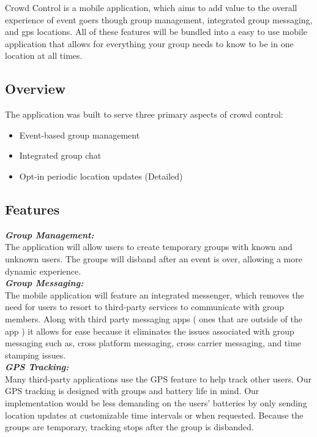 Crowd Control is a mobile application, which aims to add value to the overall experience of event goers though group management, integrated group messaging, and gps locations. All of these features will be bundled into a easy to use mobile application that allows for everything your group needs to know to be in one location at all times.

\subsection{Overview}

The application was built to serve three primary aspects of crowd control: 
\begin{itemize}
\item Event-based group management
\item Integrated group chat
\item Opt-in periodic location updates
         (Detailed)
\end{itemize}

\subsection{Features}

\textit{\textbf{Group Management:}}\\

The application will allow users to create temporary groups with known and unknown users. The groups will disband after an event is over, allowing a more dynamic experience. \\

\noindent
\textit{\textbf{Group Messaging:}} \\

The mobile application will feature an integrated messenger, which removes the need for users to resort to third-party services to communicate with group members. Along with third party messaging apps ( ones that are outside of the app ) it allows for ease because it eliminates the issues associated with group messaging such as, cross platform messaging, cross carrier messaging, and time stamping issues. \\

\noindent
\textit{\textbf{GPS Tracking:}}\\

Many third-party applications use the GPS feature to help track other users. Our GPS tracking is designed with groups and battery life in mind. Our implementation would be less demanding on the users’ batteries by only sending location updates at customizable time intervals or when requested. Because the groups are temporary, tracking stops after the group is disbanded. \\






